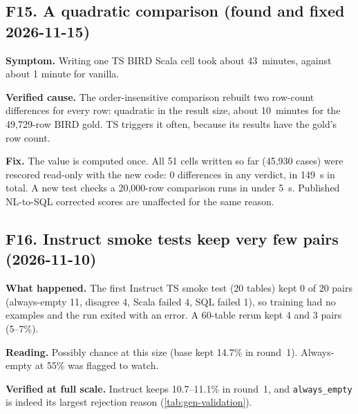 \subsection{F15. A quadratic comparison (found and fixed 2026-11-15)}\label{sec:fail-quadratic}
\begin{failbox}{}
\textbf{Symptom.} Writing one TS BIRD Scala cell took about 43~minutes, against about 1 minute for vanilla.

\textbf{Verified cause.} The order-insensitive comparison rebuilt two row-count differences for every row: quadratic in
the result size, about 10~minutes for the 49,729-row BIRD gold. TS triggers it often, because its results have the
gold's row count.

\textbf{Fix.} The value is computed once. All 51 cells written so far (45,930 cases) were rescored read-only with the
new code: 0 differences in any verdict, in 149~s in total. A new test checks a 20,000-row comparison runs in under 5~s.
Published NL-to-SQL corrected scores are unaffected for the same reason.
\end{failbox}

\subsection{F16. Instruct smoke tests keep very few pairs (2026-11-10)}
\begin{failbox}{}
\textbf{What happened.} The first Instruct TS smoke test (20 tables) kept 0 of 20 pairs (always-empty 11, disagree 4,
Scala failed 4, SQL failed 1), so training had no examples and the run exited with an error. A 60-table rerun kept 4
and 3 pairs (5--7\%).

\textbf{Reading.} Possibly chance at this size (base kept 14.7\% in round~1). Always-empty at 55\% was flagged to
watch.

\textbf{Verified at full scale.} Instruct keeps 10.7--11.1\% in round~1, and \texttt{always\_empty} is indeed its
largest rejection reason (\cref{tab:gen-validation}).
\end{failbox}

